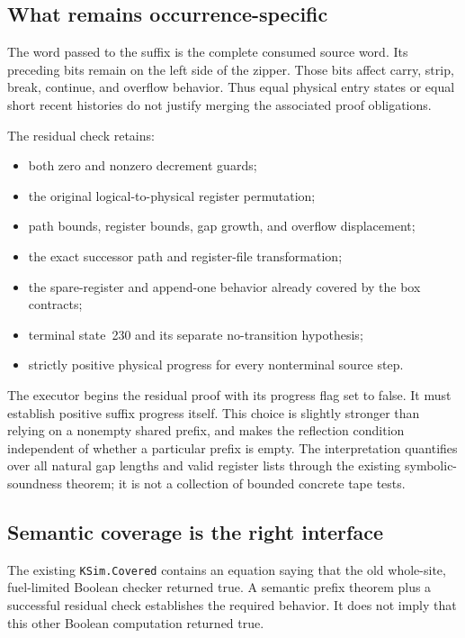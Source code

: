 \documentclass[11pt,letterpaper]{article}
\newcommand{\code}[1]{\texttt{#1}}
\begin{document}
\subsection{What remains occurrence-specific}

The word passed to the suffix is the complete consumed source word. Its preceding
bits remain on the left side of the zipper. Those bits affect carry, strip, break,
continue, and overflow behavior. Thus equal physical entry states or equal short
recent histories do not justify merging the associated proof obligations.

The residual check retains:
\begin{itemize}
\item both zero and nonzero decrement guards;
\item the original logical-to-physical register permutation;
\item path bounds, register bounds, gap growth, and overflow displacement;
\item the exact successor path and register-file transformation;
\item the spare-register and append-one behavior already covered by the box contracts;
\item terminal state~230 and its separate no-transition hypothesis;
\item strictly positive physical progress for every nonterminal source step.
\end{itemize}

The executor begins the residual proof with its progress flag set to false. It must
establish positive suffix progress itself. This choice is slightly stronger than
relying on a nonempty shared prefix, and makes the reflection condition independent
of whether a particular prefix is empty. The interpretation quantifies over all
natural gap lengths and valid register lists through the existing symbolic-soundness
theorem; it is not a collection of bounded concrete tape tests.

\subsection{Semantic coverage is the right interface}

The existing \code{KSim.Covered} contains an equation saying that the old whole-site,
fuel-limited Boolean checker returned true. A semantic prefix theorem plus a successful
residual check establishes the required behavior. It does not imply that this other
Boolean computation returned true.
\end{document}
